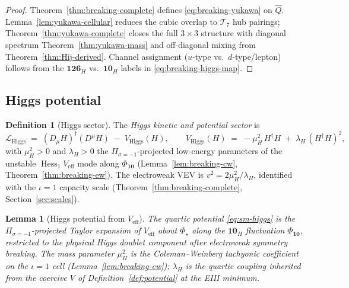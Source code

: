 \documentclass[aps,prd,onecolumn,amsmath,amssymb,nofootinbib,11pt]{revtex4-2}
\numberwithin{equation}{section}
\theoremstyle{plain}
\newtheorem{lemma}[theorem]{Lemma}
\theoremstyle{definition}
\newtheorem{definition}[theorem]{Definition}
\theoremstyle{remark}
\newcommand{\orderparam}{\Phi}
\newcommand{\Hess}{\operatorname{Hess}}
\begin{document}
\begin{proof}
Theorem~\ref{thm:breaking-complete} defines \eqref{eq:breaking-yukawa} on
$\hat Q$. Lemma~\ref{lem:yukawa-cellular} reduces the cubic overlap to
$\mathcal{T}_7$ hub pairings; Theorem~\ref{thm:yukawa-complete} closes the
full $3\times3$ structure with diagonal spectrum
Theorem~\ref{thm:yukawa-mass} and off-diagonal mixing from
Theorem~\ref{thm:Hij-derived}. Channel assignment
($u$-type vs.\ $d$-type/lepton) follows from the $\mathbf{126}_H$ vs.\
$\mathbf{10}_H$ labels in \eqref{eq:breaking-higgs-map}.
\end{proof}

\subsection{Higgs potential}
\label{sec:sm-lagrangian:higgs}

\begin{definition}[Higgs sector]\label{def:sm-higgs}
The \emph{Higgs kinetic and potential sector} is
\begin{equation}\label{eq:sm-higgs}
  \mathcal{L}_{\mathrm{Higgs}}
  \;=\;
  (D_\mu H)^\dagger(D^\mu H)
  \;-\;
  V_{\mathrm{Higgs}}(H),
  \qquad
  V_{\mathrm{Higgs}}(H)
  \;=\;
  -\mu_H^2\,H^\dagger H
  \;+\;
  \lambda_H\,(H^\dagger H)^2,
\end{equation}
with $\mu_H^2>0$ and $\lambda_H>0$ the $\Pi_{\sigma=-1}$-projected low-energy
parameters of the unstable $\Hess_1 V_{\mathrm{eff}}$ mode along
$\Phi_{\mathbf{10}}$ (Lemma~\ref{lem:breaking-cw},
Theorem~\ref{thm:breaking-ew}). The electroweak VEV is
$v^2=2\mu_H^2/\lambda_H$, identified with the $\iota=1$ capacity scale
(Theorem~\ref{thm:breaking-complete}, Section~\ref{sec:scales}).
\end{definition}

\begin{lemma}[Higgs potential from $V_{\mathrm{eff}}$]
\label{lem:sm-higgs-derived}
The quartic potential \eqref{eq:sm-higgs} is the $\Pi_{\sigma=-1}$-projected
Taylor expansion of $V_{\mathrm{eff}}$ about $\orderparam_\star$ along the
$\mathbf{10}_H$ fluctuation $\Phi_{\mathbf{10}}$, restricted to the physical
Higgs doublet component after electroweak symmetry breaking. The mass parameter
$\mu_H^2$ is the Coleman--Weinberg tachyonic coefficient on the $\iota=1$ cell
(Lemma~\ref{lem:breaking-cw}); $\lambda_H$ is the quartic coupling inherited
from the coercive $V$ of Definition~\ref{def:potential} at the EIII minimum.
\end{lemma}
\end{document}
